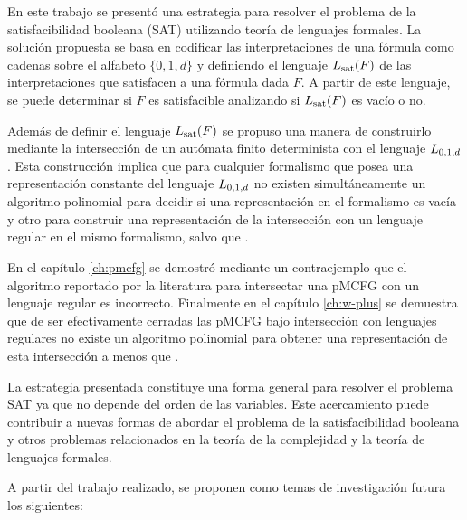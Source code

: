 \begin{conclusionsAndRecomendations}
    En este trabajo se presentó una estrategia para resolver el problema de la satisfacibilidad booleana (SAT) utilizando teoría de lenguajes formales. La solución propuesta se basa en codificar las interpretaciones de una fórmula como cadenas sobre el alfabeto $\{0, 1, d\}$ y definiendo el lenguaje $L_{\mathrm{sat}}(F)$ de las interpretaciones que satisfacen a una fórmula dada $F$. A partir de este lenguaje, se puede determinar si $F$ es satisfacible analizando si $L_{\mathrm{sat}}(F)$ es vacío o no.

    Además de definir el lenguaje $L_{\mathrm{sat}}(F)$ se propuso una manera de construirlo mediante la intersección de un autómata finito determinista con el lenguaje $L_{0,1,d}$. Esta construcción implica que para cualquier formalismo que posea una representación constante del lenguaje $L_{0,1,d}$ no existen simultáneamente un algoritmo polinomial para decidir si una representación en el formalismo es vacía y otro para construir una representación de la intersección con un lenguaje regular en el mismo formalismo, salvo que \pnp.

    En el capítulo \ref{ch:pmcfg} se demostró mediante un contraejemplo que el algoritmo reportado por la literatura para intersectar una pMCFG con un lenguaje regular es incorrecto. Finalmente en el capítulo \ref{ch:w-plus} se demuestra que de ser efectivamente cerradas las pMCFG bajo intersección con lenguajes regulares no existe un algoritmo polinomial para obtener una representación de esta intersección a menos que \pnp.

    La estrategia presentada constituye una forma general para resolver el problema SAT ya que no depende del orden de las variables. Este acercamiento puede contribuir a nuevas formas de abordar el problema de la satisfacibilidad booleana y otros problemas relacionados en la teoría de la complejidad y la teoría de lenguajes formales.

    A partir del trabajo realizado, se proponen como temas de investigación futura los siguientes:


\end{conclusionsAndRecomendations}

